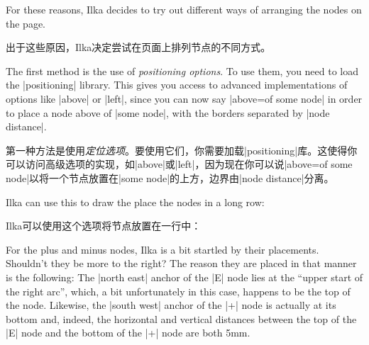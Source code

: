 For these reasons, Ilka decides to try out different ways of arranging the
nodes on the page.

出于这些原因，Ilka决定尝试在页面上排列节点的不同方式。

The first method is the use of \emph{positioning options}. To use them, you
need to load the |positioning| library. This gives you access to advanced
implementations of options like |above| or |left|, since you can now say
|above=of some node| in order to place a node above of |some node|, with the
borders separated by |node distance|.

第一种方法是使用\emph{定位选项}。要使用它们，你需要加载|positioning|库。这使得你可以访问高级选项的实现，如|above|或|left|，因为现在你可以说|above=of some node|以将一个节点放置在|some node|的上方，边界由|node distance|分离。

Ilka can use this to draw the place the nodes in a long row:

Ilka可以使用这个选项将节点放置在一行中：
%
\begin{codeexample}
\end{codeexample}
%
\begin{codeexample}[preamble={\usetikzlibrary{positioning,shapes.misc}}]
\end{codeexample}

For the plus and minus nodes, Ilka is a bit startled by their placements.
Shouldn't they be more to the right? The reason they are placed in that manner
is the following: The |north east| anchor of the |E| node lies at the ``upper
start of the right arc'', which, a bit unfortunately in this case, happens to
be the top of the node. Likewise, the |south west| anchor of the |+| node is
actually at its bottom and, indeed, the horizontal and vertical distances
between the top of the |E| node and the bottom of the |+| node are both 5mm.

